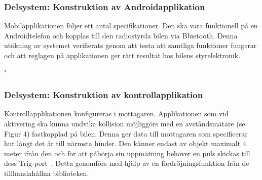 \documentclass[a4paper]{article}
\begin{document}



\subsubsection{Delsystem: Konstruktion av Androidapplikation}
Mobilapplikationen följer ett antal specifikationer. Den ska vara funktionell på en Androidtelefon och kopplas till den radiostyrda bilen via Bluetooth. Denna utökning av systemet verifierats genom att testa att samtliga funktioner fungerar och att reglagen på applikationen ger rätt resultat hos bilens styrelektronik. 

"



\subsubsection{Delsystem: Konstruktion av kontrollapplikation}
Kontrollapplikationen konfigureras i mottagaren. Applikationen som vid aktivering ska kunna undvika kollision möjliggörs med en avståndsmätare (se Figur 4) fastkopplad på bilen. Denna ger data till mottagaren som specificerar hur långt det är till närmsta hinder. Den känner endast av objekt maximalt 4 meter ifrån den och för att påbörja sin uppmätning behöver en puls skickas till dess Trig-port~\cite{DistMeasure}. Detta genomförs med hjälp av en fördröjningsfunktion från de tillhandahållna biblioteken.
\end{document}
